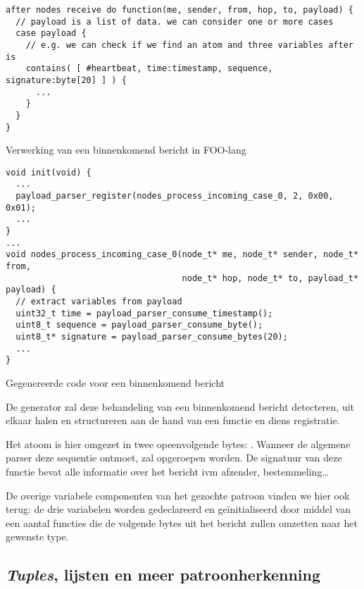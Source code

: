\begin{listing}[ht]
  \begin{verbatim}
after nodes receive do function(me, sender, from, hop, to, payload) {
  // payload is a list of data. we can consider one or more cases
  case payload {
    // e.g. we can check if we find an atom and three variables after is
    contains( [ #heartbeat, time:timestamp, sequence, signature:byte[20] ] ) {
      ...
    }
  }
}
  \end{verbatim}
  \vspace{-5mm}
  \caption{Verwerking van een binnenkomend bericht in FOO-lang}
  \label{lst:comm.foo}
\end{listing}

\begin{listing}[ht]
  \begin{verbatim}
void init(void) {
  ...
  payload_parser_register(nodes_process_incoming_case_0, 2, 0x00, 0x01);
  ...
}
...
void nodes_process_incoming_case_0(node_t* me, node_t* sender, node_t* from,
                                   node_t* hop, node_t* to, payload_t* payload) {
  // extract variables from payload
  uint32_t time = payload_parser_consume_timestamp();
  uint8_t sequence = payload_parser_consume_byte();
  uint8_t* signature = payload_parser_consume_bytes(20);
  ...
}
  \end{verbatim}
  \vspace{-5mm}
  \caption{Gegenereerde code voor een binnenkomend bericht}
  \label{lst:comm.c}
\end{listing}

De generator zal deze behandeling van een binnenkomend bericht detecteren, uit
elkaar halen en structureren aan de hand van een functie en diens registratie.

Het atoom is hier omgezet in twee opeenvolgende bytes: .
Wanneer de algemene parser deze sequentie ontmoet, zal
 opgeroepen worden. De signatuur van
deze functie bevat alle informatie over het bericht ivm afzender,
bestemmeling\dots

De overige variabele componenten van het gezochte patroon vinden we hier ook
terug: de drie variabelen worden gedeclareerd en ge\"initialiseerd door middel
van een aantal functies die de volgende bytes uit het bericht zullen omzetten
naar het gewenste type.

\subsection{\emph{Tuples}, lijsten en meer patroonherkenning}

